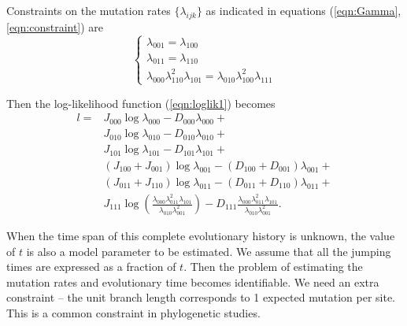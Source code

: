 \documentclass[11pt]{article}
\begin{document}
Constraints on the mutation rates $\{\lambda_{ijk}\}$ as indicated in
equations (\ref{eqn:Gamma},\ref{eqn:constraint}) are 
\begin{equation}\label{eqn:constraints}
\left\{
  \begin{array}{ll}
    \lambda_{001} = \lambda_{100}\\
    \lambda_{011} = \lambda_{110}\\
    \lambda_{000}\lambda_{110}^2\lambda_{101} = \lambda_{010}\lambda_{100}^2\lambda_{111}
  \end{array}
\right.
\end{equation}

Then the log-likelihood function (\ref{eqn:loglik1}) becomes
\begin{equation}\label{eqn:loglik2}
\begin{aligned}
l = & J_{000}\log\lambda_{000} - D_{000}\lambda_{000} + \\ 
& J_{010}\log\lambda_{010} - D_{010}\lambda_{010} + \\ 
& J_{101}\log\lambda_{101} - D_{101}\lambda_{101} + \\ 
& (J_{100} + J_{001})\log\lambda_{001} - (D_{100}+D_{001})\lambda_{001} +  \\
& (J_{011} + J_{110})\log\lambda_{011} - (D_{011}+D_{110})\lambda_{011} +  \\ 
& J_{111}\log(\frac{\lambda_{000}\lambda_{011}^2\lambda_{101}}{\lambda_{010}\lambda_{001}^2}) - D_{111}\frac{\lambda_{000}\lambda_{011}^2\lambda_{101}}{\lambda_{010}\lambda_{001}^2}.
\end{aligned}
\end{equation}

When the time span of this complete evolutionary history is unknown,
the value of $t$ is also a model parameter to be estimated. We assume
that all the jumping times are expressed as a fraction of $t$. Then
the problem of estimating the mutation rates and evolutionary time
becomes identifiable. We need an extra constraint -- the unit branch
length corresponds to 1 expected mutation per site. This is a common
constraint in phylogenetic studies.
\end{document}
